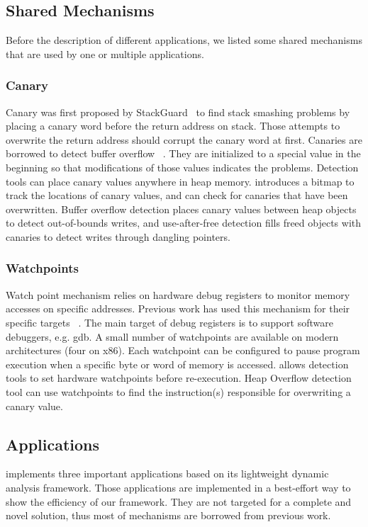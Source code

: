 \label{sec:applications}

\subsection{Shared Mechanisms}
Before the description of different applications, we listed some shared mechanisms that are used by one or multiple applications. 

\subsubsection{Canary}
\label{sec:canary}
Canary was first proposed by StackGuard~\cite{StackGuard} to find stack smashing problems by placing a canary word before the return address on stack. Those attempts to overwrite the return address should corrupt the canary word at first. Canaries are borrowed to detect buffer overflow ~\cite{overflow:purify}. They are initialized to a special value in the beginning so that modifications of those values indicates the problems. Detection tools can place canary values anywhere in heap memory. \doubletake{} introduces a bitmap to track the locations of canary values, and can check for canaries that have been overwritten. Buffer overflow detection places canary values between heap objects to detect out-of-bounds writes, and use-after-free detection fills freed objects with canaries to detect writes through dangling pointers.

\subsubsection{Watchpoints}
\label{sec:watchpoints}
Watch point mechanism relies on hardware debug registers to monitor memory accesses on specific addresses. Previous work has used this mechanism for their specific targets ~\cite{fastboundschecking, Kivati}. The main target of debug registers is to support software debuggers, e.g. gdb. A small number of watchpoints are available on modern architectures (four on x86). Each watchpoint can be configured to pause program execution when a specific byte or word of memory is accessed. \doubletake{} allows detection tools to set hardware watchpoints before re-execution. Heap Overflow detection tool can use watchpoints to find the instruction(s) responsible for overwriting a canary value.

\subsection{Applications}
\doubletake{} implements three important applications based on its lightweight dynamic analysis framework. Those applications are implemented in a best-effort way to show the efficiency of our framework. They are not targeted for a complete and novel solution, thus most of mechanisms are borrowed from previous work. 

